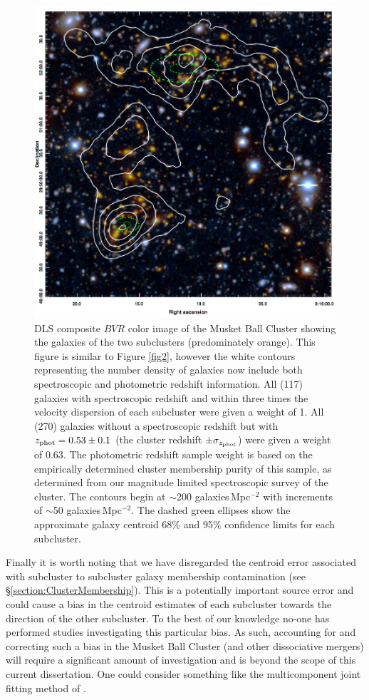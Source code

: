\begin{figure}
\centering
\includegraphics[width=5in]{Chapter4/DLScolor_wGalDenCon.png}
\caption[Musket Ball Cluster galaxy number density map including spectroscopic redshift information.]{
DLS composite $BVR$ color image of the Musket Ball Cluster showing  the galaxies of the two subclusters (predominately orange). 
This figure is similar to Figure \ref{fig2}, however the white contours representing the number density of galaxies now include both spectroscopic and photometric redshift information.
All (117) galaxies with spectroscopic redshift and within three times the velocity dispersion of each subcluster were given a weight of 1.
All (270) galaxies without a spectroscopic redshift but with $z_{\rm phot}=0.53\pm0.1$ (the cluster redshift $\pm\sigma_{z_{\rm phot}}$) were given a weight of 0.63.
The photometric redshift sample weight is based on the empirically determined cluster membership purity of this sample, as determined from our magnitude limited spectroscopic survey of the cluster.
The contours begin at $\sim$200 galaxies\,Mpc$^{-2}$ with increments of $\sim$50 galaxies\,Mpc$^{-2}$.
The dashed green ellipses show the approximate galaxy centroid 68\% and 95\% confidence limits for each subcluster.
}
\label{figure:GalDenMap_withspec}
\end{figure}

Finally it is worth noting that  we have disregarded the centroid error associated with subcluster to subcluster galaxy membership contamination (see \S\ref{section:ClusterMembership}).
This is a potentially important source error and could cause a bias in the centroid estimates of each subcluster towards the direction of the other subcluster.
To the best of our knowledge no-one has performed studies investigating this particular bias. As such, accounting for and correcting such a bias in the Musket Ball Cluster (and other dissociative mergers) will require a significant amount of investigation and is beyond the scope of this current dissertation.
One could consider something like the multicomponent joint fitting method of \citet{Walker:2011eg}.


